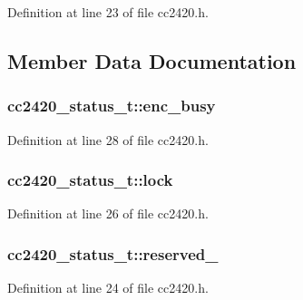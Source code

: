 Definition at line 23 of file cc2420.\+h.



\subsection{Member Data Documentation}
\subsubsection[{\texorpdfstring{enc\+\_\+busy}{enc_busy}}]{ cc2420\+\_\+status\+\_\+t\+::enc\+\_\+busy}\hypertarget{structcc2420__status__t_aadd27306e9ca766cd40fb24fbaad1daa}{}\label{structcc2420__status__t_aadd27306e9ca766cd40fb24fbaad1daa}


Definition at line 28 of file cc2420.\+h.

\subsubsection[{\texorpdfstring{lock}{lock}}]{ cc2420\+\_\+status\+\_\+t\+::lock}\hypertarget{structcc2420__status__t_aaa02843a2bf240864389da62c44988d9}{}\label{structcc2420__status__t_aaa02843a2bf240864389da62c44988d9}


Definition at line 26 of file cc2420.\+h.

\subsubsection[{\texorpdfstring{reserved\+\_\+1}{reserved_1}}]{ cc2420\+\_\+status\+\_\+t\+::reserved\+\_}\hypertarget{structcc2420__status__t_a3887f68a2676cd4457baef22ec4552e8}{}\label{structcc2420__status__t_a3887f68a2676cd4457baef22ec4552e8}


Definition at line 24 of file cc2420.\+h.

